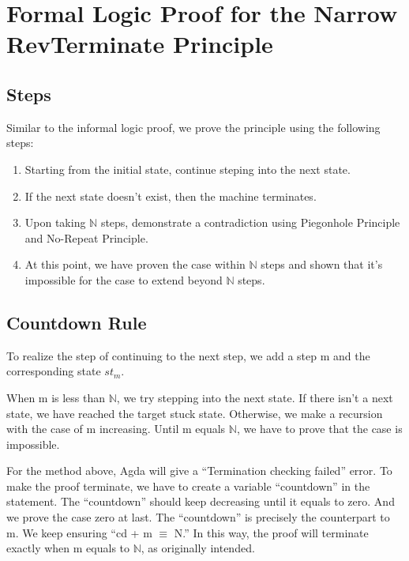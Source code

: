 \section{Formal Logic Proof for the Narrow RevTerminate Principle}

\subsection{ Steps }


Similar to the informal logic proof, we prove the principle using the following steps:
\begin{enumerate}[1.]
    \item Starting from the initial state, continue steping into the next state.
    \item If the next state doesn't exist, then the machine terminates.
    \item Upon taking $\mathbb{N}$ steps, demonstrate a contradiction using Piegonhole Principle and No-Repeat Principle.
    \item At this point, we have proven the case within $\mathbb{N}$ steps and shown that it's impossible for the case to extend beyond $\mathbb{N}$ steps.
\end{enumerate}

\subsection{ Countdown Rule }
To realize the step of continuing to the next step, we add a step m and the corresponding state $st_{m}$.


When m is less than $\mathbb{N}$, we try stepping into the next state.  
If there isn't a next state, we have reached the target stuck state.  
Otherwise, we make a recursion with the case of m increasing.
Until m equals $\mathbb{N}$, we have to prove that the case is impossible.


For the method above, Agda will give a ``Termination checking failed'' error.
To make the proof terminate, we have to create a variable ``countdown'' in the statement.  
The ``countdown'' should keep decreasing until it equals to zero.  And we prove the case zero at last.
The ``countdown'' is precisely the counterpart to m.  
We keep ensuring ``cd + m $\equiv$ N.''  
In this way, the proof will terminate exactly when m equals to $\mathbb{N}$, as originally intended.

